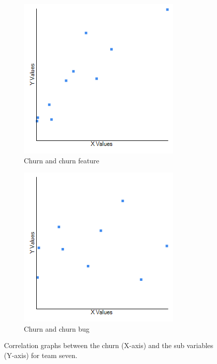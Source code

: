 \documentclass[UKenglish]{ifimaster}  %
\begin{document}
\begin{minipage}[t]{\linewidth}
\begin{figure}[H]
  \begin{subfigure}[b]{0.5\textwidth}
  \center
\includegraphics[scale=0.6]{Picture/Seven/ChrnvsChrnFT.png}
 \caption{Churn and churn feature} 
 \label{fig:a:7}
  \end{subfigure}
  \begin{subfigure}[b]{0.5\textwidth}
  \center
\includegraphics[scale=0.6]{Picture/Seven/ChrnvsChrnB.png}
 \caption{Churn and churn bug} 
\label{fig:b:7}
  \end{subfigure}
\caption{Correlation graphs between the churn (X-axis)  and the sub variables (Y-axis) for team seven.}
\label{corr:Difference:7}
\end{figure}
\end{minipage}
\end{document}
